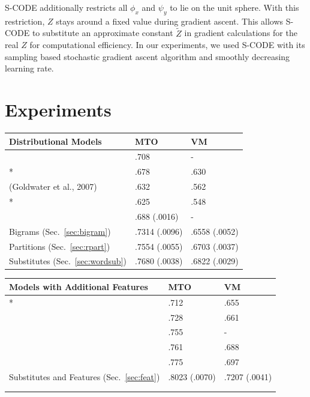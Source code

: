 \documentclass[11pt]{article}
\newcommand{\mto}{\mbox{MTO }}
\newcommand{\vm}{\mbox{VM }}
\newcommand{\bgmto}{.7314 (.0096)}
\newcommand{\bgvm}{.6558 (.0052)}
\newcommand{\rpmto}{.7554 (.0055)}
\newcommand{\rpvm}{.6703 (.0037)}
\newcommand{\wsmto}{.7680 (.0038)}
\newcommand{\wsvm}{.6822 (.0029)}
\newcommand{\ftmto}{.8023 (.0070)}
\newcommand{\ftvm}{.7207 (.0041)}
\begin{document}
S-CODE \cite{maron2010sphere} additionally restricts all $\phi_x$ and
$\psi_y$ to lie on the unit sphere.  With this restriction, $Z$ stays
around a fixed value during gradient ascent.  This allows S-CODE to
substitute an approximate constant $\tilde{Z}$ in gradient
calculations for the real $Z$ for computational efficiency.  In our
experiments, we used S-CODE with its sampling based stochastic
gradient ascent algorithm and smoothly decreasing learning
rate.

\section{Experiments}
\label{sec:exp}

\begin{table}[t] \footnotesize

\begin{tabular}{|l|l|l|}
\hline
Distributional Models & \mto & \vm \\
\hline
\cite{Lamar:2010:LCU:1870658.1870736} & .708 & -\\ %
\cite{Brown:1992:CNG:176313.176316}* & .678 & .630\\
(Goldwater et al., 2007) & .632 & .562\\
\cite{Ganchev:2010:PRS:1859890.1859918}* & .625 & .548\\
\cite{maron2010sphere} & .688 (.0016)&-\\
Bigrams (Sec.~\ref{sec:bigram}) & \bgmto & \bgvm \\
Partitions (Sec.~\ref{sec:rpart}) & \rpmto & \rpvm \\
Substitutes (Sec.~\ref{sec:wordsub}) & \wsmto & \wsvm \\
\hline
\end{tabular}
\begin{tabular}{|l|l|l|}
\hline
Models with Additional Features & \mto & \vm \\
\hline
\cite{Clark:2003:CDM:1067807.1067817}* & .712 & .655 \\
\cite{christodoulopoulos-goldwater-steedman:2011:EMNLP} & .728 & .661\\
\cite{bergkirkpatrick-klein:2010:ACL} & .755 & -\\ %
\cite{Christodoulopoulos:2010:TDU:1870658.1870714} & .761 & .688\\
\cite{blunsom-cohn:2011:ACL-HLT2011} & .775 & .697\\
Substitutes and Features (Sec.~\ref{sec:feat}) & \ftmto & \ftvm \\
& & \\
& & \\
\hline
\end{tabular}


\end{table}
\end{document}
